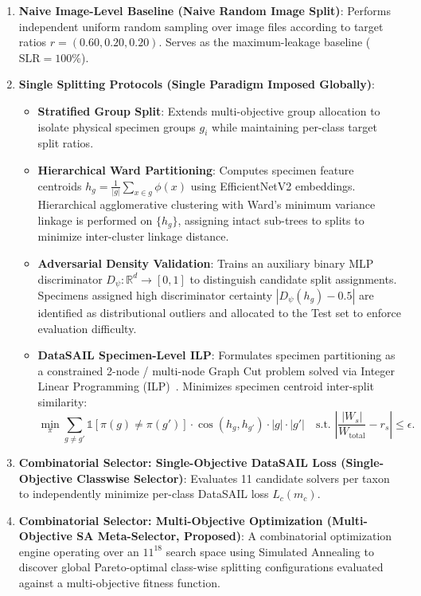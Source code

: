 \begin{enumerate}[label=\textbf{Category \Roman*:}, leftmargin=*]
\item \textbf{Naive Image-Level Baseline (\textsf{Naive Random Image Split})}: Performs independent uniform random sampling over image files according to target ratios $r = (0.60, 0.20, 0.20)$. Serves as the maximum-leakage baseline ($\mathrm{SLR} = 100\%$).

\item \textbf{Single Splitting Protocols (Single Paradigm Imposed Globally)}:
\begin{itemize}
\item \textbf{\textsf{Stratified Group Split}}: Extends multi-objective group allocation to isolate physical specimen groups $g_i$ while maintaining per-class target split ratios.
\item \textbf{\textsf{Hierarchical Ward Partitioning}}: Computes specimen feature centroids $h_g = \frac{1}{|g|} \sum_{x \in g} \phi(x)$ using EfficientNetV2 embeddings. Hierarchical agglomerative clustering with Ward's minimum variance linkage is performed on $\{h_g\}$, assigning intact sub-trees to splits to minimize inter-cluster linkage distance.
\item \textbf{\textsf{Adversarial Density Validation}}: Trains an auxiliary binary MLP discriminator $D_\psi: \mathbb{R}^d \to [0, 1]$ to distinguish candidate split assignments. Specimens assigned high discriminator certainty $|D_\psi(h_g) - 0.5|$ are identified as distributional outliers and allocated to the Test set to enforce evaluation difficulty.
\item \textbf{\textsf{DataSAIL Specimen-Level ILP}}: Formulates specimen partitioning as a constrained 2-node / multi-node Graph Cut problem solved via Integer Linear Programming (ILP)~\cite{kalina2023}. Minimizes specimen centroid inter-split similarity:
\begin{equation}
\min_{\pi} \sum_{g \neq g'} \mathbb{1}[\pi(g) \neq \pi(g')] \cdot \cos(h_g, h_{g'}) \cdot |g| \cdot |g'| \quad \text{s.t. } \left| \frac{|W_s|}{W_{\text{total}}} - r_s \right| \le \epsilon.
\end{equation}
\end{itemize}

\item \textbf{Combinatorial Selector: Single-Objective DataSAIL Loss (\textsf{Single-Objective Classwise Selector})}: Evaluates 11 candidate solvers per taxon to independently minimize per-class DataSAIL loss $L_c(m_c)$.

\item \textbf{Combinatorial Selector: Multi-Objective Optimization (\textsf{Multi-Objective SA Meta-Selector}, Proposed)}: A combinatorial optimization engine operating over an $11^{18}$ search space using Simulated Annealing to discover global Pareto-optimal class-wise splitting configurations evaluated against a multi-objective fitness function.
\end{enumerate}

